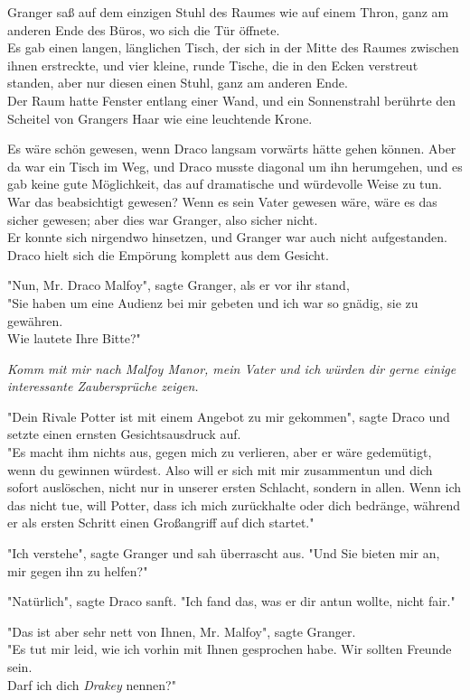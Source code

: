 {Granger saß auf dem einzigen Stuhl des Raumes wie auf einem Thron, ganz am anderen Ende des Büros, wo sich die Tür öffnete.\\ Es gab einen langen, länglichen Tisch, der sich in der Mitte des Raumes zwischen ihnen erstreckte, und vier kleine, runde Tische, die in den Ecken verstreut standen, aber nur diesen einen Stuhl, ganz am anderen Ende.\\ Der Raum hatte Fenster entlang einer Wand, und ein Sonnenstrahl berührte den Scheitel von Grangers Haar wie eine leuchtende Krone.

Es wäre schön gewesen, wenn Draco langsam vorwärts hätte gehen können. Aber da war ein Tisch im Weg, und Draco musste diagonal um ihn herumgehen, und es gab keine gute Möglichkeit, das auf dramatische und würdevolle Weise zu tun.\\ War das beabsichtigt gewesen? Wenn es sein Vater gewesen wäre, wäre es das sicher gewesen; aber dies war Granger, also sicher nicht.\\ Er konnte sich nirgendwo hinsetzen, und Granger war auch nicht aufgestanden. Draco hielt sich die Empörung komplett aus dem Gesicht.

"Nun, Mr. Draco Malfoy", sagte Granger, als er vor ihr stand,\\ "Sie haben um eine Audienz bei mir gebeten und ich war so gnädig, sie zu gewähren.\\ Wie lautete Ihre Bitte?"

\emph{Komm mit mir nach Malfoy Manor, mein Vater und ich würden dir gerne einige interessante Zaubersprüche zeigen.}

"Dein Rivale Potter ist mit einem Angebot zu mir gekommen", sagte Draco und setzte einen ernsten Gesichtsausdruck auf.\\ "Es macht ihm nichts aus, gegen mich zu verlieren, aber er wäre gedemütigt, wenn du gewinnen würdest. Also will er sich mit mir zusammentun und dich sofort auslöschen, nicht nur in unserer ersten Schlacht, sondern in allen. Wenn ich das nicht tue, will Potter, dass ich mich zurückhalte oder dich bedränge, während er als ersten Schritt einen Großangriff auf dich startet."

"Ich verstehe", sagte Granger und sah überrascht aus. "Und Sie bieten mir an, mir gegen ihn zu helfen?"

"Natürlich", sagte Draco sanft. "Ich fand das, was er dir antun wollte, nicht fair."

"Das ist aber sehr nett von Ihnen, Mr. Malfoy", sagte Granger.\\ "Es tut mir leid, wie ich vorhin mit Ihnen gesprochen habe. Wir sollten Freunde sein.\\ Darf ich dich \emph{Drakey} nennen?"

}
